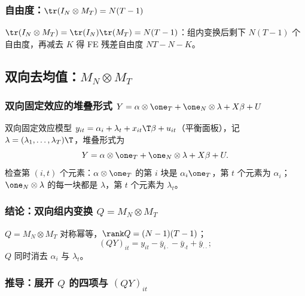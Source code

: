 \subsubsection{自由度：\texorpdfstring{$\tr(I_N\otimes M_T)=N(T-1)$}{tr(I x M\_T) = N(T-1)}}

$\tr(I_N\otimes M_T)=\tr(I_N)\tr(M_T)=N(T-1)$：组内变换后剩下 $N(T-1)$ 个自由度，再减去 $K$ 得 FE 残差自由度 $NT-N-K$。

\subsection{双向去均值：\texorpdfstring{$M_N\otimes M_T$}{M\_N x M\_T}}

\subsubsection{双向固定效应的堆叠形式 \texorpdfstring{$Y=\alpha\otimes\one_T+\one_N\otimes\lambda+X\beta+U$}{Y = alpha x 1 + 1 x lambda + X beta + U}}

双向固定效应模型 $y_{it}=\alpha_i+\lambda_t+x_{it}\T\beta+u_{it}$（平衡面板），记 $\lambda=(\lambda_1,\dots,\lambda_T)\T$，堆叠形式为
\[
Y=\alpha\otimes\one_T+\one_N\otimes\lambda+X\beta+U.
\]
检查第 $(i,t)$ 个元素：$\alpha\otimes\one_T$ 的第 $i$ 块是 $\alpha_i\one_T$，第 $t$ 个元素为 $\alpha_i$；$\one_N\otimes\lambda$ 的每一块都是 $\lambda$，第 $t$ 个元素为 $\lambda_t$。

\subsubsection{结论：双向组内变换 \texorpdfstring{$Q=M_N\otimes M_T$}{Q = M\_N x M\_T}}

\begin{thm}[双向组内变换]\label{thm:U01a-twoway}
 $Q=M_N\otimes M_T$ 对称幂等，$\rank Q=(N-1)(T-1)$；
\[
(QY)_{it}=y_{it}-\bar y_{i\cdot}-\bar y_{\cdot t}+\bar y_{\cdot\cdot};
\]
$Q$ 同时消去 $\alpha_i$ 与 $\lambda_t$。
\end{thm}

\subsubsection{推导：展开 \texorpdfstring{$Q$}{Q} 的四项与 \texorpdfstring{$(QY)_{it}$}{(QY)\_it}}

